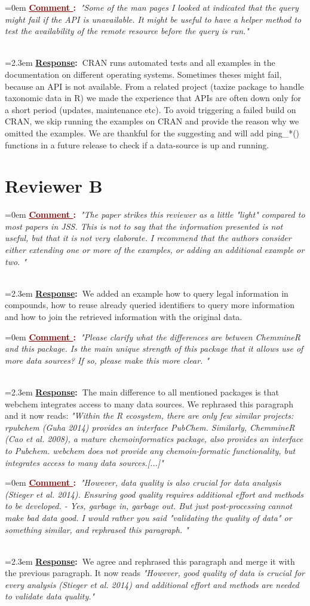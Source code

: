 \documentclass[12pt]{article}
\newcounter{cN}
\newcommand{\comment}[1]{
	\vspace{2em} 
	\refstepcounter{cN} %
	\noindent \hangindent=0em \textbf{\textcolor{Maroon}{\uline{Comment \thecN}:~}}\emph{"#1"}
	}
\newcommand{\response}[1]{
	\\[0.25em] 
	\hangindent=2.3em \textbf{\textcolor{NavyBlue}{\uline{Response}:~}}#1 
	}
\begin{document}
\comment{Some of the man pages I looked at indicated that the query might fail if the API is unavailable. It might be useful to have a helper method to test the availability of the remote resource before the query is run.}
\response{CRAN runs automated tests and all examples in the documentation on different operating systems. Sometimes theses might fail, because an API is not available. From a related project (taxize package to handle taxonomic data in R) we made the experience that APIs are often down only for a short period (updates, maintenance etc). To avoid triggering a failed build on CRAN, we skip running the examples on CRAN and provide the reason why we omitted the examples.
We are thankful for the suggesting and will add ping\_*() functions in a future release to check if a data-source is up and running. 
}


\section{Reviewer B}

\comment{The paper strikes this reviewer as a little "light" compared to most papers
in JSS. This is not to say that the information presented is not useful, but
that it is not very elaborate. I recommend that the authors consider either
extending one or more of the examples, or adding an additional example or two.
}
\response{We added an example how to query legal information in compounds, how to reuse already queried identifiers to query more information and how to join the retrieved information with the original data.}

\comment{Please clarify what the differences are between ChemmineR and this package.
Is the main unique strength of this package that it allows use of more data
sources? If so, please make this more clear. }
\response{The main difference to all mentioned packages is that webchem integrates access to many data sources. We rephrased this paragraph and it now reads: \emph{"Within the R ecosystem, there are only few similar projects: rpubchem (Guha 2014) provides an interface PubChem. 
Similarly, ChemmineR (Cao et al. 2008), a mature chemoinformatics package, also provides an interface to Pubchem. 
webchem does not provide any chemoin-formatic functionality, but integrates access to many data sources.[...]"}
}

\comment{However, data quality is also crucial for data analysis (Stieger et
al. 2014). Ensuring good quality requires additional effort and
methods to be developed.  - Yes, garbage in, garbage out. But just post-processing cannot make bad data
good. I would rather you said "validating the quality of
data" or something similar, and rephrased this paragraph. }
\response{We agree and rephrased this paragraph and merge it with the previous paragraph. It now reads \emph{"However, good quality of data is crucial for every analysis (Stieger et al. 2014) and additional effort and methods are needed to validate data quality."}}
\end{document}
